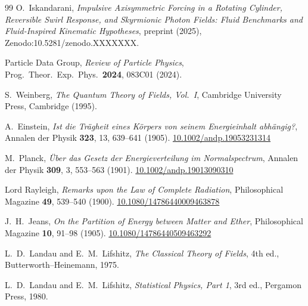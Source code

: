 \documentclass[11pt]{article}
\begin{document}
\begin{thebibliography}{99}
            O.~Iskandarani,
            \newblock \emph{Impulsive Axisymmetric Forcing in a Rotating Cylinder, Reversible Swirl Response, and Skyrmionic Photon Fields: Fluid Benchmarks and Fluid-Inspired Kinematic Hypotheses},
            \newblock preprint (2025), Zenodo:10.5281/zenodo.XXXXXXX.

            Particle Data Group,
            \newblock \emph{Review of Particle Physics},
            \newblock Prog.\ Theor.\ Exp.\ Phys.\ \textbf{2024}, 083C01 (2024).

            S.~Weinberg,
            \newblock \emph{The Quantum Theory of Fields, Vol.\ I},
            \newblock Cambridge University Press, Cambridge (1995).


            A.~Einstein,
            \newblock \emph{Ist die Tr\"agheit eines K\"orpers von seinem Energieinhalt abh\"angig?},
            \newblock Annalen der Physik \textbf{323}, 13, 639--641 (1905).
            \newblock \href{https://doi.org/10.1002/andp.19053231314}{10.1002/andp.19053231314}

            M.~Planck,
            \newblock \emph{{\"U}ber das Gesetz der Energieverteilung im Normalspectrum},
            \newblock Annalen der Physik \textbf{309}, 3, 553--563 (1901).
            \newblock \href{https://doi.org/10.1002/andp.19013090310}{10.1002/andp.19013090310}

            Lord Rayleigh,
            \newblock \emph{Remarks upon the Law of Complete Radiation},
            \newblock Philosophical Magazine \textbf{49}, 539--540 (1900).
            \newblock \href{https://doi.org/10.1080/14786440009463878}{10.1080/14786440009463878}

            J.~H.~Jeans,
            \newblock \emph{On the Partition of Energy between Matter and Ether},
            \newblock Philosophical Magazine \textbf{10}, 91--98 (1905).
            \newblock \href{https://doi.org/10.1080/14786440509463292}{10.1080/14786440509463292}

            L.~D.~Landau and E.~M.~Lifshitz,
            \newblock \emph{The Classical Theory of Fields}, 4th ed.,
            \newblock Butterworth--Heinemann, 1975.

            L.~D.~Landau and E.~M.~Lifshitz,
            \newblock \emph{Statistical Physics, Part 1}, 3rd ed.,
            \newblock Pergamon Press, 1980.


\end{thebibliography}
\end{document}
